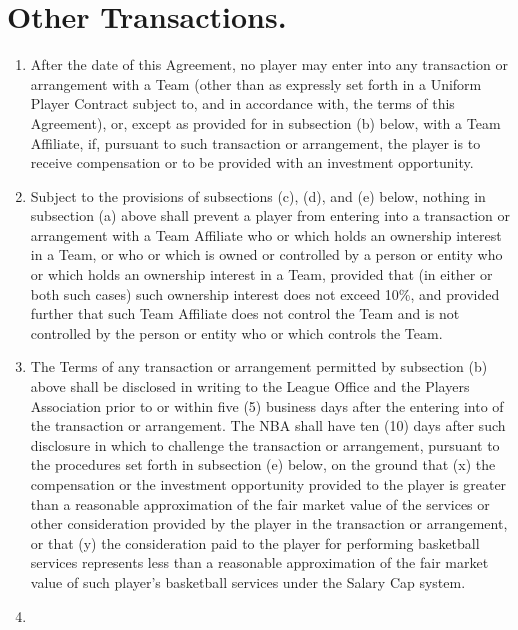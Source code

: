 \documentclass[
]{book}
\begin{document}
\hypertarget{other-transactions.}{%
\section{Other Transactions.}\label{other-transactions.}}

\begin{enumerate}
\def\labelenumi{(\alph{enumi})}
\item
  After the date of this Agreement, no player may enter into any transaction or arrangement with a Team (other than as expressly set forth in a Uniform Player Contract subject to, and in accordance with, the terms of this Agreement), or, except as provided for in subsection (b) below, with a Team Affiliate, if, pursuant to such transaction or arrangement, the player is to receive compensation or to be provided with an investment opportunity.
\item
  Subject to the provisions of subsections (c), (d), and (e) below, nothing in subsection (a) above shall prevent a player from entering into a transaction or arrangement with a Team Affiliate who or which holds an ownership interest in a Team, or who or which is owned or controlled by a person or entity who or which holds an ownership interest in a Team, provided that (in either or both such cases) such ownership interest does not exceed 10\%, and provided further that such Team Affiliate does not control the Team and is not controlled by the person or entity who or which controls the Team.
\item
  The Terms of any transaction or arrangement permitted by subsection (b) above shall be disclosed in writing to the League Office and the Players Association prior to or within five (5) business days after the entering into of the transaction or arrangement. The NBA shall have ten (10) days after such disclosure in which to challenge the transaction or arrangement, pursuant to the procedures set forth in subsection (e) below, on the ground that (x) the compensation or the investment opportunity provided to the player is greater than a reasonable approximation of the fair market value of the services or other consideration provided by the player in the transaction or arrangement, or that (y) the consideration paid to the player for performing basketball services represents less than a reasonable approximation of the fair market value of such player's basketball services under the Salary Cap system.
\item

\end{enumerate}
\end{document}
